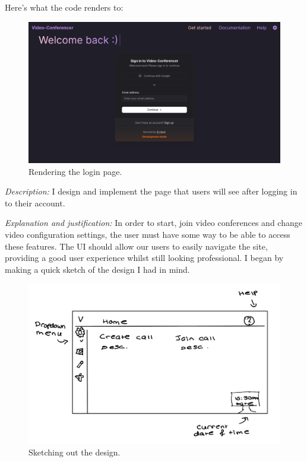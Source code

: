 Here's what the code renders to: \\

\begin{figure}[H]

\centering
\includegraphics[scale=0.2]{Images/Login.png}

\caption{Rendering the login page.}

\end{figure}

\textit{Description:} I design and implement the page that
users will see after logging in to their account. \\
\vspace{0.2cm}

\textit{Explanation and justification:} In order to start,
join video conferences and change video configuration
settings, the user must have some way to be able to access
these features. The UI should allow our users to easily
navigate the site, providing a good user experience whilst
still looking professional. I began by making a quick sketch
of the design I had in mind. \\

\begin{figure}[h]
\centering

\includegraphics[scale=0.2]{Images/Home_sketch.png}

\caption{Sketching out the design.}
\end{figure}

